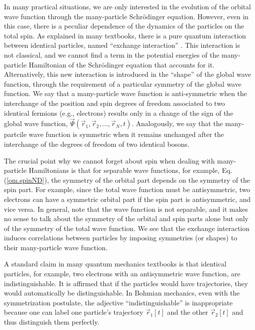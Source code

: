 \documentclass[onecolumn,nofootinbib, secnumarabic, amsmath, nobibnotes,11pt,aps,pra]{revtex4-1}
\newcommand{\eref}[1]{Eq. (\ref{#1})}
\begin{document}
In many practical situations, we are only interested in the
evolution of the orbital wave function through the many-particle
Schr\"odinger equation. However, even in this case, there is a
peculiar dependence of the dynamics of the particles on the total
spin. As explained in many textbooks, there is a pure quantum
interaction between identical particles, named ``exchange
interaction'' \cite{om.sakurai94,om.landaulif}. This interaction is
not classical, and we cannot find a term in the potential energies
of the many-particle Hamiltonian of the Schr\"odinger equation that
accounts for it. Alternatively, this new interaction is introduced
in the ``shape'' of the global wave function, through the
requirement of a particular symmetry of the global wave function. We
say that a many-particle wave function is anti-symmetric when the interchange of
the position and spin degrees of freedom associated to two
identical fermions (e.g., electrons) results only in a change of the
sign of the global wave function, $\vec \Psi(\vec r_1,\vec
r_2,\ldots,\vec r_N,t)$. Analogously, we say that the
many-partcile wave function is symmetric when it
remains unchanged after the interchange of the degrees of freedom of
two identical  bosons.

The crucial point why we cannot forget about spin when dealing with
many-particle Hamiltonians is that for separable wave
functions, for example, \eref{om.spinND}, the symmetry of the
orbital part depends on the symmetry of the spin part. For example,
since the total wave function must be antisymmetric, two electrons
can have a symmetric orbital part if the spin part is antisymmetric,
and vice versa. In general, note that the wave function is not
separable, and it makes no sense to talk about the symmetry of the
orbital and spin parts alone but only of the symmetry of the total
wave function. We see that the exchange interaction induces
correlations between particles by imposing symmetries (or shapes) to
their many-particle wave function.\enlargethispage{-1pc}

A standard claim in many quantum mechanics textbooks is that identical particles, for example, two electrons with an antisymmetric wave function, are indistinguishable. It is affirmed that if the particles would have trajectories, they would automatically be distinguishable. In Bohmian mechanics, even with the symmetrization postulate, the adjective ``indistinguishable'' is inappropriate because one can label one particle's trajectory $\vec r_1[t]$ and the other $\vec r_2[t]$ and thus distinguish them perfectly.
\end{document}
